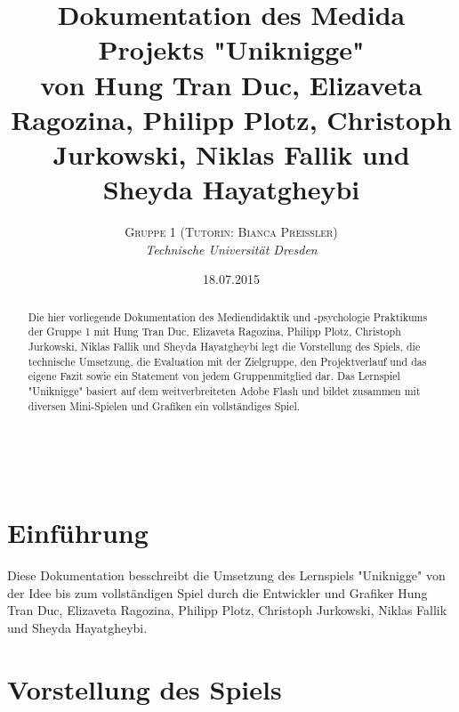 \documentclass[a4paper, 11pt]{article} %
\title{\textbf{Dokumentation des Medida Projekts "Uniknigge"}\\ %
von Hung Tran Duc, Elizaveta Ragozina, Philipp Plotz, Christoph Jurkowski, Niklas Fallik und Sheyda Hayatgheybi} %
\author{\textsc{Gruppe 1 (Tutorin: Bianca Preißler)} %
\\{\textit{Technische Universität Dresden}}} %
\date{18.07.2015} %
\makeatletter
\renewcommand{\maketitle}{ %
\begin{flushright} %
{\LARGE\@title} %

\vspace{50pt} %

{\large\@author} %
\\\@date %

\vspace{40pt} %
\end{flushright}
}
\makeatother
\begin{document}
\maketitle %


\renewcommand{\abstractname}{Präambel} %

\vspace{5cm} %


\begin{abstract}
\noindent
Die hier vorliegende Dokumentation des Mediendidaktik und -psychologie Praktikums der Gruppe 1 mit Hung Tran Duc, Elizaveta Ragozina, Philipp Plotz, Christoph Jurkowski, Niklas Fallik und Sheyda Hayatgheybi legt die Vorstellung des Spiels, die technische Umsetzung, die Evaluation mit der Zielgruppe, den Projektverlauf
und das eigene Fazit sowie ein Statement von jedem Gruppenmitglied dar. Das Lernspiel "Uniknigge" basiert auf dem weitverbreiteten Adobe Flash und bildet zusammen mit diversen Mini-Spielen und Grafiken ein vollständiges Spiel.
\end{abstract}



\newpage
\renewcommand{\contentsname}{Inhaltsverzeichnis}
\tableofcontents

\newpage
\section{Einführung}
Diese Dokumentation besschreibt die Umsetzung des Lernspiels "Uniknigge" von der Idee bis zum vollständigen Spiel durch die Entwickler und Grafiker Hung Tran Duc, Elizaveta Ragozina, Philipp Plotz, Christoph Jurkowski, Niklas Fallik und Sheyda Hayatgheybi.

\section{Vorstellung des Spiels}
\end{document}
